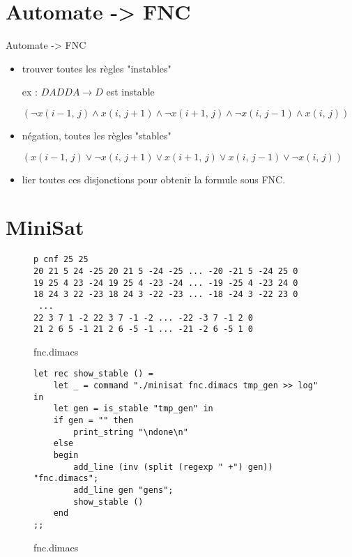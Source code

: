 \documentclass[10pt]{beamer}
\begin{document}
\section{Automate -> FNC}

\begin{frame}{Automate -> FNC}
	\begin{itemize}[<+- | alert@+>]
		\item trouver toutes les règles "instables"
		
		ex : $DADDA \rightarrow D$ est instable
		
		 $(\neg x(i-1,\, j) \wedge x(i,\, j+1) \wedge \neg x(i+1,\, j) \wedge \neg x(i,\, j-1) \wedge x(i,\, j))$
		 
		\item négation, toutes les règles "stables"
		
		$( x(i-1,\, j) \vee \neg x(i,\, j+1) \vee x(i+1,\, j) \vee x(i,\, j-1) \vee \neg x(i,\, j))$
		
		\item lier toutes ces disjonctions pour obtenir la formule sous FNC.
		
	\end{itemize}
\end{frame}


\section{MiniSat}

\begin{frame}[fragile]
\begin{figure}
\caption{fnc.dimacs}
\begin{lstlisting}
p cnf 25 25
20 21 5 24 -25 20 21 5 -24 -25 ... -20 -21 5 -24 25 0
19 25 4 23 -24 19 25 4 -23 -24 ... -19 -25 4 -23 24 0
18 24 3 22 -23 18 24 3 -22 -23 ... -18 -24 3 -22 23 0
 ...
22 3 7 1 -2 22 3 7 -1 -2 ... -22 -3 7 -1 2 0
21 2 6 5 -1 21 2 6 -5 -1 ... -21 -2 6 -5 1 0
\end{lstlisting}
\end{figure}
\end{frame}

\begin{frame}[fragile]
\lstset{basicstyle=\footnotesize}
\begin{figure}
\caption{fnc.dimacs}
\begin{lstlisting}
let rec show_stable () =
    let _ = command "./minisat fnc.dimacs tmp_gen >> log" in
    let gen = is_stable "tmp_gen" in
    if gen = "" then
        print_string "\ndone\n"
    else
    begin
        add_line (inv (split (regexp " +") gen)) "fnc.dimacs";
        add_line gen "gens";
        show_stable ()
    end
;;
\end{lstlisting}
\end{figure}
\end{frame}

\end{document}
